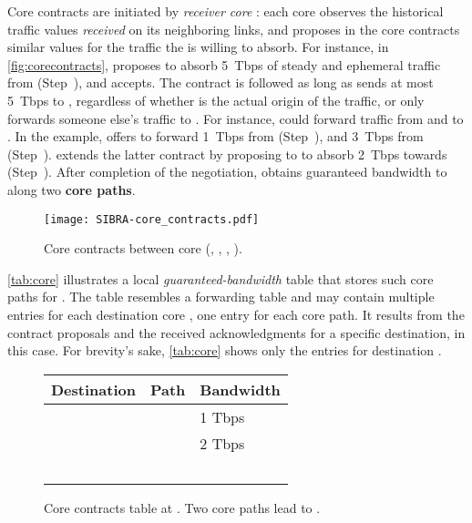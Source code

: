 Core contracts are initiated by \textit{receiver core \ADs}: each core \AD
observes the historical traffic values \textit{received} on its neighboring
links, and proposes in the core contracts similar values for the traffic the
\AD is willing to absorb. For instance, in \autoref{fig:corecontracts},
 proposes to absorb 5~Tbps of steady and ephemeral traffic from
 (Step~), and  accepts. The contract is followed as long as 
sends at most 5~Tbps to , regardless of whether  is the
actual origin of the traffic, or  only forwards someone else's traffic
to . For instance,  could forward traffic from  and
 to . In the example,  offers to forward 1~Tbps
from  (Step~), and 3~Tbps from 
(Step~).  extends the latter contract by proposing to
 to absorb 2~Tbps towards  (Step~). After
completion of the negotiation,  obtains guaranteed bandwidth to
 along two \textbf{core paths}.


\label{sec:contracts}
\begin{figure}[t]
  \begin{center}
    \texttt{[image: SIBRA-core\_contracts.pdf]}
  \end{center}
  \caption{Core contracts between core \ADs (, , ,
    ).}
  \vspace{-3mm}
  \label{fig:corecontracts}
\end{figure}

\autoref{tab:core} illustrates a local \emph{guaranteed-bandwidth} table that
stores such core paths for . The table resembles a forwarding table
and may contain multiple entries for each destination core \AD, one entry for
each core path. It results from the contract proposals and the received
acknowledgments for a specific destination,  in this case. For
brevity's sake, \autoref{tab:core} shows only the entries for destination
.

\begin{figure}[tp]
\small
\renewcommand{\arraystretch}{1.0}
\centering
 \begin{tabular}{lll}
 \hline
 Destination & \centering Path & Bandwidth \\ [0.5ex]
 \hline\hline
 &  & 1 Tbps\\
 &  & 2 Tbps \\ [-1ex]
 ~  & ~  & ~  \\
 \hline
 \end{tabular}
\caption{Core contracts table at . Two core paths lead to .}
\vspace{-5mm}
\label{tab:core}
\end{figure}

